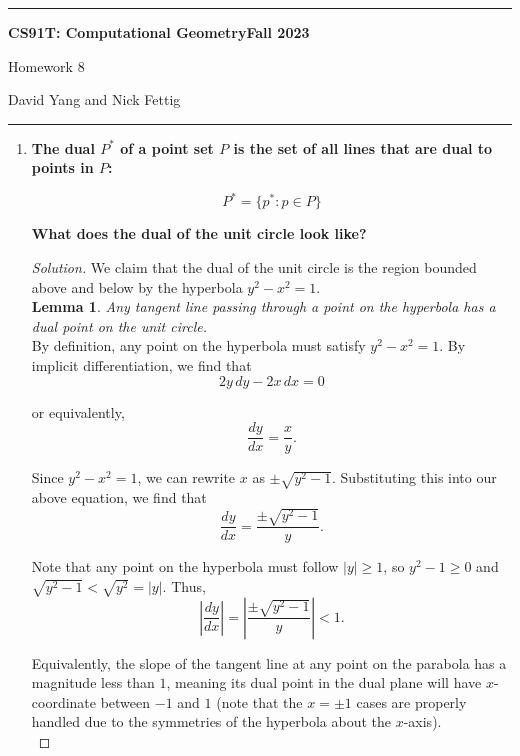 \documentclass[11pt]{article}
\newenvironment{solution}
  {\renewcommand\qedsymbol{$\blacksquare$}\begin{proof}[Solution]}
  {\end{proof}}
\begin{document}
\hrule
\begin{center}
    \textbf{CS91T: Computational Geometry}\hfill \textbf{Fall 2023}\newline

    {\Large Homework 8}

    David Yang and Nick Fettig
\end{center}

\hrule

\vspace{1em}

\begin{enumerate}

\item\textbf{The dual $P^*$ of a point set $P$ is the set of all lines that are dual to points in $P$:}

\[P^* = \{p^*: p\in P\}\]

\textbf{What does the dual of the unit circle look like?}

\vspace{1em}

\begin{solution}

We claim that the dual of the unit circle is the region bounded above and below by the hyperbola $y^2-x^2 = 1.$ \\

\textbf{Lemma 1}. \textit{Any tangent line passing through a point on the hyperbola has a dual point on the unit circle.} \\

By definition, any point on the hyperbola must satisfy $y^2-x^2 = 1.$ By implicit differentiation, we find that
\[ 2y \, dy - 2x \, dx = 0\]

or equivalently, \[ \frac{dy}{dx} = \frac{x}{y}.\]

Since $y^2-x^2 = 1$, we can rewrite $x$ as $\pm \sqrt{y^2-1}.$ Substituting this into our above equation, we find that
\[ \frac{dy}{dx} = \frac{\pm \sqrt{y^2-1}}{y}.\]

Note that any point on the hyperbola must follow $|y| \geq 1$, so $y^2 - 1 \geq 0$ and $\sqrt{y^2-1} < \sqrt{y^2} = |y|.$ Thus, \[ \left|\frac{dy}{dx}\right| = \left|\frac{\pm \sqrt{y^2-1}}{y} \right| < 1.\]

Equivalently, the slope of the tangent line at any point on the parabola has a magnitude less than $1$, meaning its dual point in the dual plane will have $x$-coordinate between $-1$ and $1$ (note that the $x = \pm 1$ cases are properly handled due to the symmetries of the hyperbola about the $x$-axis). \\


\end{solution}
\end{enumerate}
\end{document}
